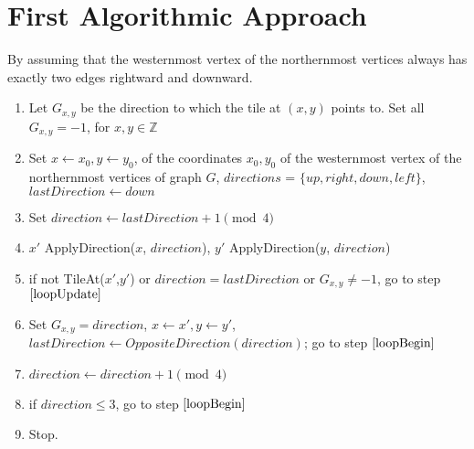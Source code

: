 \section{First Algorithmic Approach}
By assuming that the westernmost vertex of the northernmost vertices always has exactly two edges rightward and downward. 
\begin{enumerate}[1.]
\item Let $G_{x,y}$ be the direction to which the tile at $(x,y)$ points to. Set all $G_{x,y}=-1$, for $x,y \in \mathbb{Z}$
\item Set $x\gets x_0, y\gets y_0$, of the coordinates $x_0,y_0$ of the westernmost vertex of the northernmost vertices of graph $G$, $directions$ = $\{up,right,down,left\}$, $lastDirection\gets down$
\item \label{loopBegin} Set $direction \gets lastDirection+1 \pmod{4}$
\item $x'$ \gets ApplyDirection($x$, $direction$), $y'$ \gets ApplyDirection($y$, $direction$)
\item if not TileAt($x'$,$y'$) or $direction = lastDirection$ or $G_{x,y}\ne -1$, go to step $\ref{loopUpdate}$
\item Set $G_{x,y} = direction$, $x \gets x', y \gets y'$, $lastDirection \gets OppositeDirection(direction)$; go to step $\ref{loopBegin}$
\item \label{loopUpdate} $direction \gets direction+1 \pmod{4}$
\item if $direction\leq 3$, go to step $\ref{loopBegin}$
\item Stop.
\end{enumerate}
